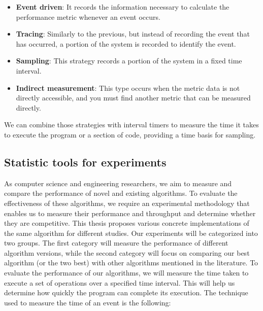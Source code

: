 \begin{itemize}
\item \textbf{Event driven}: It records the information necessary to calculate the
performance metric whenever an event occurs.
\item \textbf{Tracing}: Similarly to the previous, but instead of recording the event
that has occurred, a portion of the system is recorded to identify the event.
\item \textbf{Sampling}: This strategy records a portion of the system in a fixed time
interval.
\item \textbf{Indirect measurement}: This type occurs when the metric data is not
directly accessible, and you must find another metric that can be measured
directly.
\end{itemize}

We can combine those strategies with interval timers to measure the time it takes to execute the program or a section of code, providing a time basis for sampling.




\subsection{\label{subsec:statistics}Statistic tools for experiments}

As computer science and engineering researchers, we aim to measure and compare the performance of novel and existing algorithms. To evaluate the effectiveness of these algorithms, we require an experimental methodology that enables us to measure their performance and throughput and determine whether they are competitive. This thesis proposes various concrete implementations of the same algorithm for different studies. Our experiments will be categorized into two groups. The first category will measure the performance of different algorithm versions, while the second category will focus on comparing our best algorithm (or the two best) with other algorithms mentioned in the literature. To evaluate the performance of our algorithms, we will measure the time taken to execute a set of operations over a specified time interval. This will help us determine how quickly the program can complete its execution. The technique used to measure the time of an event is the following:

